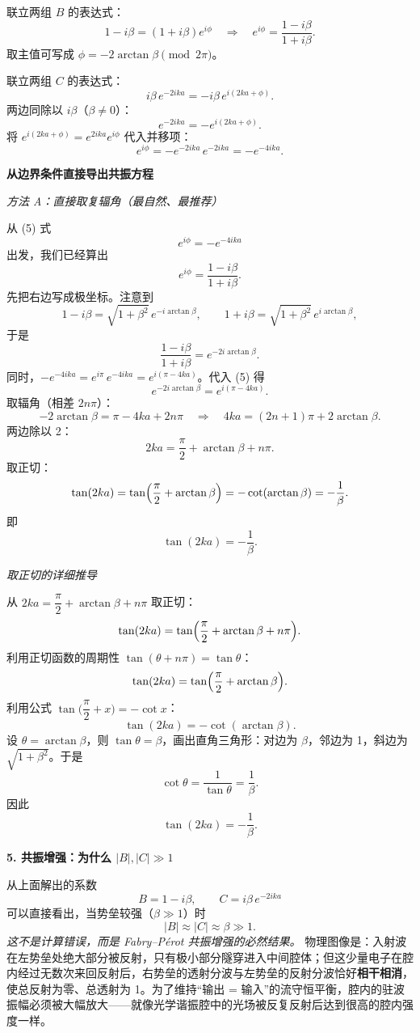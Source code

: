 \begin{derivationbox}[标准解题过程]
联立两组 $B$ 的表达式：
\[
1-i\beta = (1+i\beta)e^{i\phi} \quad\Longrightarrow\quad \boxed{e^{i\phi}=\frac{1-i\beta}{1+i\beta}}.
\]
取主值可写成 $\displaystyle \phi = -2\arctan\beta \pmod{2\pi}$。

联立两组 $C$ 的表达式：
\[
i\beta\,e^{-2ika} = -i\beta\,e^{i(2ka+\phi)}.
\]
两边同除以 $i\beta$（$\beta\neq 0$）：
\[
e^{-2ika} = -e^{i(2ka+\phi)}.
\]
将 $e^{i(2ka+\phi)} = e^{2ika}e^{i\phi}$ 代入并移项：
\[
e^{i\phi} = -e^{-2ika}\,e^{-2ika} = -e^{-4ika}. \tag{5}
\]

\textbf{从边界条件直接导出共振方程}

\textit{方法 A：直接取复辐角（最自然、最推荐）}

从 (5) 式
\[
e^{i\phi} = -e^{-4ika}
\]
出发，我们已经算出
\[
e^{i\phi} = \frac{1-i\beta}{1+i\beta}.
\]
先把右边写成极坐标。注意到
\[
1-i\beta = \sqrt{1+\beta^2}\,e^{-i\arctan\beta}, \qquad
1+i\beta = \sqrt{1+\beta^2}\,e^{i\arctan\beta},
\]
于是
\[
\frac{1-i\beta}{1+i\beta} = e^{-2i\arctan\beta}.
\]
同时，$-e^{-4ika} = e^{i\pi}\,e^{-4ika} = e^{i(\pi-4ka)}$。代入 (5) 得
\[
e^{-2i\arctan\beta} = e^{i(\pi-4ka)}.
\]
取辐角（相差 $2n\pi$）：
\[
-2\arctan\beta = \pi - 4ka + 2n\pi
\quad\Longrightarrow\quad
4ka = (2n+1)\pi + 2\arctan\beta.
\]
两边除以 2：
\[
2ka = \frac{\pi}{2} + \arctan\beta + n\pi.
\]
取正切：
\[
\tan(2ka) = \tan\Bigl(\frac{\pi}{2} + \arctan\beta\Bigr) = -\cot(\arctan\beta) = -\frac{1}{\beta}.
\]
即
\[
\boxed{\tan(2ka) = -\frac{1}{\beta}}.
\]

\textit{取正切的详细推导}

从 $2ka = \dfrac{\pi}{2} + \arctan\beta + n\pi$ 取正切：
\[
\tan(2ka) = \tan\Bigl(\frac{\pi}{2} + \arctan\beta + n\pi\Bigr).
\]
利用正切函数的周期性 $\tan(\theta + n\pi) = \tan\theta$：
\[
\tan(2ka) = \tan\Bigl(\frac{\pi}{2} + \arctan\beta\Bigr).
\]
利用公式 $\tan\bigl(\dfrac{\pi}{2} + x\bigr) = -\cot x$：
\[
\tan(2ka) = -\cot(\arctan\beta).
\]
设 $\theta = \arctan\beta$，则 $\tan\theta = \beta$，画出直角三角形：对边为 $\beta$，邻边为 1，斜边为 $\sqrt{1+\beta^2}$。于是
\[
\cot\theta = \frac{1}{\tan\theta} = \frac{1}{\beta}.
\]
因此
\[
\boxed{\tan(2ka) = -\frac{1}{\beta}}.
\]

\textbf{5. 共振增强：为什么 $|B|,|C|\gg 1$}

从上面解出的系数
\[
B = 1-i\beta, \qquad C = i\beta\,e^{-2ika}
\]
可以直接看出，当势垒较强（$\beta\gg 1$）时
\[
|B| \approx |C| \approx \beta \gg 1.
\]
\textit{这不是计算错误，而是 Fabry--P\'erot 共振增强的必然结果。} 物理图像是：入射波在左势垒处绝大部分被反射，只有极小部分隧穿进入中间腔体；但这少量电子在腔内经过无数次来回反射后，右势垒的透射分波与左势垒的反射分波恰好\textbf{相干相消}，使总反射为零、总透射为 1。为了维持``输出 = 输入''的流守恒平衡，腔内的驻波振幅必须被大幅放大——就像光学谐振腔中的光场被反复反射后达到很高的腔内强度一样。

\end{derivationbox}

